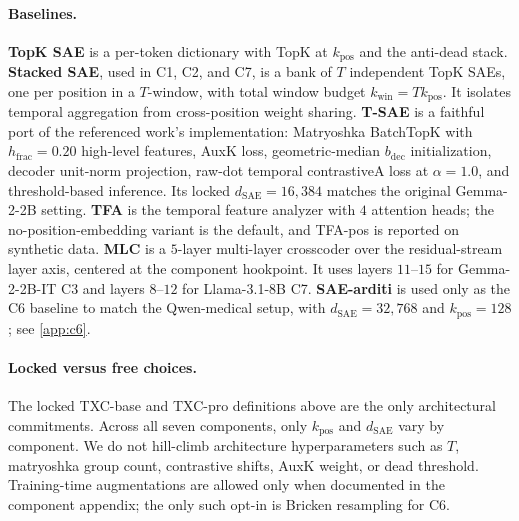 \paragraph{Baselines.}
\textbf{TopK SAE} \citep{gao2024scaling} is a per-token dictionary with TopK at $k_{\mathrm{pos}}$ and the anti-dead stack. \textbf{Stacked SAE}, used in C1, C2, and C7, is a bank of $T$ independent TopK SAEs, one per position in a $T$-window, with total window budget $k_{\mathrm{win}}=T k_{\mathrm{pos}}$. It isolates temporal aggregation from cross-position weight sharing. \textbf{T-SAE} \citep{bhalla2025tsae} is a faithful port of the referenced work's implementation: Matryoshka BatchTopK with $h_{\mathrm{frac}}=0.20$ high-level features, AuxK loss, geometric-median $b_{\mathrm{dec}}$ initialization, decoder unit-norm projection, raw-dot temporal contrastiveA loss at $\alpha=1.0$, and threshold-based inference. Its locked $d_{\mathrm{SAE}}=16{,}384$ matches the original Gemma-2-2B setting. \textbf{TFA} \citep{lubana2025priors} is the temporal feature analyzer with $4$ attention heads; the no-position-embedding variant is the default, and TFA-pos is reported on synthetic data. \textbf{MLC} \citep{lindsey2024sparsecrosscoders} is a $5$-layer multi-layer crosscoder over the residual-stream layer axis, centered at the component hookpoint. It uses layers $11$--$15$ for Gemma-2-2B-IT C3 and layers $8$--$12$ for Llama-3.1-8B C7. \textbf{SAE-arditi} is used only as the C6 baseline to match the Qwen-medical setup, with $d_{\mathrm{SAE}}=32{,}768$ and $k_{\mathrm{pos}}=128$; see \cref{app:c6}.

\paragraph{Locked versus free choices.}
The locked TXC-base and TXC-pro definitions above are the only architectural commitments. Across all seven components, only $k_{\mathrm{pos}}$ and $d_{\mathrm{SAE}}$ vary by component. We do not hill-climb architecture hyperparameters such as $T$, matryoshka group count, contrastive shifts, AuxK weight, or dead threshold. Training-time augmentations are allowed only when documented in the component appendix; the only such opt-in is Bricken resampling for C6.



